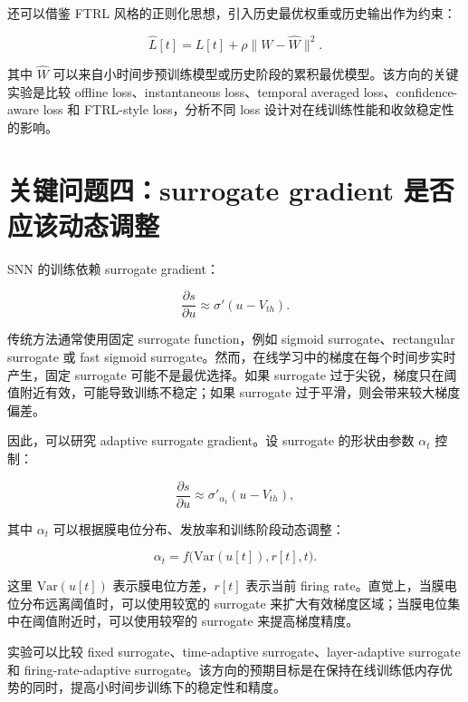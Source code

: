 \documentclass[11pt]{ctexart}
\begin{document}
还可以借鉴 FTRL 风格的正则化思想，引入历史最优权重或历史输出作为约束：

\begin{equation}
\hat L[t]
=
L[t]
+
\rho\|W-\hat W\|^2 .
\end{equation}

其中 $\hat W$ 可以来自小时间步预训练模型或历史阶段的累积最优模型。该方向的关键实验是比较 offline loss、instantaneous loss、temporal averaged loss、confidence-aware loss 和 FTRL-style loss，分析不同 loss 设计对在线训练性能和收敛稳定性的影响。

\section{关键问题四：surrogate gradient 是否应该动态调整}

SNN 的训练依赖 surrogate gradient：

\begin{equation}
\frac{\partial s}{\partial u}
\approx
\sigma'(u-V_{th}).
\end{equation}

传统方法通常使用固定 surrogate function，例如 sigmoid surrogate、rectangular surrogate 或 fast sigmoid surrogate。然而，在线学习中的梯度在每个时间步实时产生，固定 surrogate 可能不是最优选择。如果 surrogate 过于尖锐，梯度只在阈值附近有效，可能导致训练不稳定；如果 surrogate 过于平滑，则会带来较大梯度偏差。

因此，可以研究 adaptive surrogate gradient。设 surrogate 的形状由参数 $\alpha_t$ 控制：

\begin{equation}
\frac{\partial s}{\partial u}
\approx
\sigma'_{\alpha_t}(u-V_{th}),
\end{equation}

其中 $\alpha_t$ 可以根据膜电位分布、发放率和训练阶段动态调整：

\begin{equation}
\alpha_t = f\big(\mathrm{Var}(u[t]), r[t], t\big).
\end{equation}

这里 $\mathrm{Var}(u[t])$ 表示膜电位方差，$r[t]$ 表示当前 firing rate。直觉上，当膜电位分布远离阈值时，可以使用较宽的 surrogate 来扩大有效梯度区域；当膜电位集中在阈值附近时，可以使用较窄的 surrogate 来提高梯度精度。

实验可以比较 fixed surrogate、time-adaptive surrogate、layer-adaptive surrogate 和 firing-rate-adaptive surrogate。该方向的预期目标是在保持在线训练低内存优势的同时，提高小时间步训练下的稳定性和精度。
\end{document}
